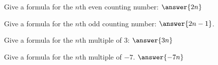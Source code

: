 \documentclass[nooutcomes]{ximera}
\begin{document}
\begin{problem}
Give a formula for the $n$th even counting number: $\answer{2n}$
\end{problem}

\begin{problem}
Give a formula for the $n$th odd counting number: $\answer{2n-1}$. 
\end{problem}

\begin{problem}
Give a formula for the $n$th multiple of $3$:  $\answer{3n}$
\end{problem}

\begin{problem}
Give a formula for the $n$th multiple of $-7$. $\answer{-7n}$
\end{problem}
\end{document}
